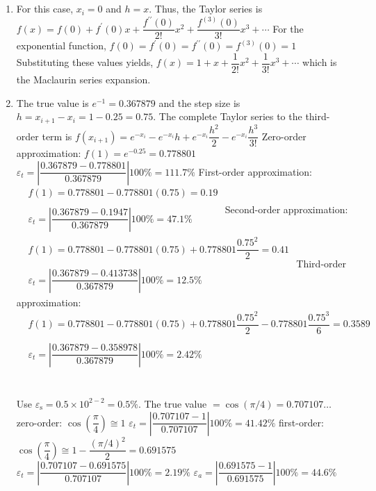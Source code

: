 \documentclass[../main.tex]{subfiles}
\begin{document}
\section{}
\begin{enumerate}[label=\bfseries(\alph*)]
\item For this case, $x_{i}=0$ and $h=x$. Thus, the Taylor series is
\bigbreak
$f(x)=f(0)+f^{\prime}(0) x+\dfrac{f^{\prime \prime}(0)}{2 !} x^{2}+\dfrac{f^{(3)}(0)}{3 !} x^{3}+\cdots$
\bigbreak
For the exponential function,
\bigbreak
$f(0)=f^{\prime}(0)=f^{\prime \prime}(0)=f^{(3)}(0)=1$
\bigbreak
Substituting these values yields,
\bigbreak
 $f(x)=1+x+\dfrac{1}{2 !} x^{2}+\dfrac{1}{3 !} x^{3}+\cdots$
 \bigbreak
which is the Maclaurin series expansion.
\bigbreak
\item  The true value is $e^{-1}=0.367879$ and the step size is $h=x_{i+1}-x_{i}=1-0.25=0.75$. The complete Taylor series to the third-order term is
\bigbreak
$f\left(x_{i+1}\right)=e^{-x_{i}}-e^{-x_{i}} h+e^{-x_{i}} \dfrac{h^{2}}{2}-e^{-x_{i}} \dfrac{h^{3}}{3 !}$
\bigbreak
Zero-order approximation:
\bigbreak
$f(1)=e^{-0.25}=0.778801$
\bigbreak
$\varepsilon_{t}=\left|\dfrac{0.367879-0.778801}{0.367879}\right| 100 \%=111.7 \%$
\bigbreak
First-order approximation:
\bigbreak
$
\begin{aligned}
&f(1)=0.778801-0.778801(0.75)=0.19 \\ \\
&\varepsilon_{t}=\left|\dfrac{0.367879-0.1947}{0.367879}\right| 100 \%=47.1 \%
\end{aligned}
$
\bigbreak
Second-order approximation:
\bigbreak
$
\begin{aligned}
&f(1)=0.778801-0.778801(0.75)+0.778801 \dfrac{0.75^{2}}{2}=0.41 \\ \\
&\varepsilon_{t}=\left|\dfrac{0.367879-0.413738}{0.367879}\right| 100 \%=12.5 \%
\end{aligned}
$
\bigbreak
Third-order approximation:
\bigbreak
$
\begin{aligned}
&f(1)=0.778801-0.778801(0.75)+0.778801 \dfrac{0.75^{2}}{2}-0.778801 \dfrac{0.75^{3}}{6}=0.3589 \\ \\
&\varepsilon_{t}=\left|\dfrac{0.367879-0.358978}{0.367879}\right| 100 \%=2.42 \%
\end{aligned}
$
\bigbreak
\section{}
Use $\varepsilon_{\mathrm{s}}=0.5 \times 10^{2-2}=0.5 \%$. The true value $=\cos (\pi / 4)=0.707107 \ldots$
\bigbreak
zero-order: 
\bigbreak
$\cos \left(\dfrac{\pi}{4}\right) \cong 1$
\bigbreak
$\varepsilon_{t}=\left|\dfrac{0.707107-1}{0.707107}\right| 100 \%=41.42 \%$
\bigbreak
first-order:
\bigbreak
$\cos \left(\dfrac{\pi}{4}\right) \cong 1-\dfrac{(\pi / 4)^{2}}{2}=0.691575$
\bigbreak
$\varepsilon_{t}=\left|\dfrac{0.707107-0.691575}{0.707107}\right| 100 \%=2.19 \%$
\bigbreak
$\varepsilon_{a}=\left|\dfrac{0.691575-1}{0.691575}\right| 100 \%=44.6 \%$
\bigbreak


\end{enumerate}
\end{document}
